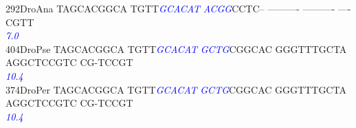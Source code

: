 \documentclass[11pt,twoside,reqno,a4paper]{article}
\begin{document}
{292\hspace*{1\charwidth}DroAna	TAGCACGGCA	TGTT\textit{\textcolor{blue}{G}}\textit{\textcolor{blue}{C}}\textit{\textcolor{blue}{A}}\textit{\textcolor{blue}{C}}\textit{\textcolor{blue}{A}}\textit{\textcolor{blue}{T}}	\textit{\textcolor{blue}{A}}\textit{\textcolor{blue}{C}}\textit{\textcolor{blue}{G}}\textit{\textcolor{blue}{G}}CCTC--	----------	----------	----CGTT\\
\hspace*{4\charwidth}\hspace*{7\charwidth}\hspace*{1\charwidth}\hspace*{14\charwidth}\textit{\textcolor{blue}{7.0}}\hspace*{1\charwidth}\hspace*{1\charwidth}\hspace*{1\charwidth}\hspace*{1\charwidth}\\
404\hspace*{1\charwidth}DroPse	TAGCACGGCA	TGTT\textit{\textcolor{blue}{G}}\textit{\textcolor{blue}{C}}\textit{\textcolor{blue}{A}}\textit{\textcolor{blue}{C}}\textit{\textcolor{blue}{A}}\textit{\textcolor{blue}{T}}	\textit{\textcolor{blue}{G}}\textit{\textcolor{blue}{C}}\textit{\textcolor{blue}{T}}\textit{\textcolor{blue}{G}}CGGCAC	GGGTTTGCTA	AGGCTCCGTC	CG-TCCGT\\
\hspace*{4\charwidth}\hspace*{7\charwidth}\hspace*{1\charwidth}\hspace*{14\charwidth}\textit{\textcolor{blue}{10.4}}\hspace*{1\charwidth}\hspace*{1\charwidth}\hspace*{1\charwidth}\hspace*{1\charwidth}\\
374\hspace*{1\charwidth}DroPer	TAGCACGGCA	TGTT\textit{\textcolor{blue}{G}}\textit{\textcolor{blue}{C}}\textit{\textcolor{blue}{A}}\textit{\textcolor{blue}{C}}\textit{\textcolor{blue}{A}}\textit{\textcolor{blue}{T}}	\textit{\textcolor{blue}{G}}\textit{\textcolor{blue}{C}}\textit{\textcolor{blue}{T}}\textit{\textcolor{blue}{G}}CGGCAC	GGGTTTGCTA	AGGCTCCGTC	CG-TCCGT\\
\hspace*{4\charwidth}\hspace*{7\charwidth}\hspace*{1\charwidth}\hspace*{14\charwidth}\textit{\textcolor{blue}{10.4}}\hspace*{1\charwidth}\hspace*{1\charwidth}\hspace*{1\charwidth}\hspace*{1\charwidth}\\
}
\end{document}
